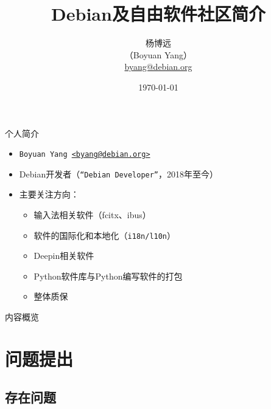 \documentclass{beamer}
\title[Intro to Debian and FLOSS community]{Debian及自由软件社区简介}
\author[@byang/@hosiet]{杨博远 \\ （Boyuan Yang） \\ \href{mailto:byang@debian.org}{byang@debian.org} }
\institute[Debian]{Debian Project}
\date{\today}
\begin{document}
	
\begin{frame}
\titlepage
\end{frame}

\begin{frame}{个人简介}
	\begin{itemize}
		\item \texttt{Boyuan Yang \href{mailto:byang@debian.org}{<byang@debian.org>}}
		\item Debian开发者（\texttt{“Debian Developer”}，2018年至今）
		\item 主要关注方向： \\
		\begin{itemize}
			\item 输入法相关软件（fcitx、ibus）
			\item 软件的国际化和本地化（\texttt{i18n/l10n}）
			\item Deepin相关软件
			\item Python软件库与Python编写软件的打包
			\item 整体质保
		\end{itemize}
	\end{itemize}
    \vfill
\end{frame}



	
\begin{frame}{内容概览}
\tableofcontents
\end{frame}



\section{问题提出}
\subsection{存在问题}
\end{document}
